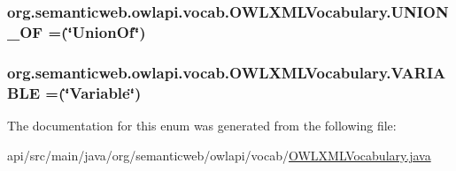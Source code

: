 \hypertarget{enumorg_1_1semanticweb_1_1owlapi_1_1vocab_1_1_o_w_l_x_m_l_vocabulary_a9e813d334c3796854cce374a694f6426}{
\subsubsection[{U\-N\-I\-O\-N\-\_\-\-O\-F}]{\setlength{\rightskip}{0pt plus 5cm}org.\-semanticweb.\-owlapi.\-vocab.\-O\-W\-L\-X\-M\-L\-Vocabulary.\-U\-N\-I\-O\-N\-\_\-\-O\-F =(\char`\"{}Union\-Of\char`\"{})}}\label{enumorg_1_1semanticweb_1_1owlapi_1_1vocab_1_1_o_w_l_x_m_l_vocabulary_a9e813d334c3796854cce374a694f6426}
\hypertarget{enumorg_1_1semanticweb_1_1owlapi_1_1vocab_1_1_o_w_l_x_m_l_vocabulary_a331336ee05c5860e5b98e878f4477ac5}{
\subsubsection[{V\-A\-R\-I\-A\-B\-L\-E}]{\setlength{\rightskip}{0pt plus 5cm}org.\-semanticweb.\-owlapi.\-vocab.\-O\-W\-L\-X\-M\-L\-Vocabulary.\-V\-A\-R\-I\-A\-B\-L\-E =(\char`\"{}Variable\char`\"{})}}\label{enumorg_1_1semanticweb_1_1owlapi_1_1vocab_1_1_o_w_l_x_m_l_vocabulary_a331336ee05c5860e5b98e878f4477ac5}


The documentation for this enum was generated from the following file\-:\begin{DoxyCompactItemize}
\item 
api/src/main/java/org/semanticweb/owlapi/vocab/\hyperlink{_o_w_l_x_m_l_vocabulary_8java}{O\-W\-L\-X\-M\-L\-Vocabulary.\-java}\end{DoxyCompactItemize}
